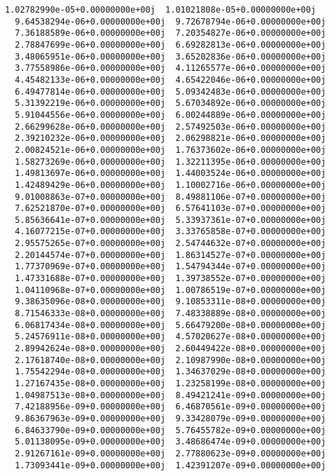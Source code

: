 \documentclass[11pt]{article}
\begin{document}
\begin{Verbatim}[commandchars=\\\{\}]
  1.02782990e-05+0.00000000e+00j  1.01021808e-05+0.00000000e+00j
  9.64538294e-06+0.00000000e+00j  9.72678794e-06+0.00000000e+00j
  7.36188589e-06+0.00000000e+00j  7.20354827e-06+0.00000000e+00j
  2.78847699e-06+0.00000000e+00j  6.69282813e-06+0.00000000e+00j
  3.48065951e-06+0.00000000e+00j  3.65202836e-06+0.00000000e+00j
  3.77558986e-06+0.00000000e+00j  4.11265577e-06+0.00000000e+00j
  4.45482133e-06+0.00000000e+00j  4.65422046e-06+0.00000000e+00j
  6.49477814e-06+0.00000000e+00j  5.09342483e-06+0.00000000e+00j
  5.31392219e-06+0.00000000e+00j  5.67034892e-06+0.00000000e+00j
  5.91044556e-06+0.00000000e+00j  6.00244889e-06+0.00000000e+00j
  2.66299628e-06+0.00000000e+00j  2.57492503e-06+0.00000000e+00j
  2.39210232e-06+0.00000000e+00j  2.06298821e-06+0.00000000e+00j
  2.00824521e-06+0.00000000e+00j  1.76373602e-06+0.00000000e+00j
  1.58273269e-06+0.00000000e+00j  1.32211395e-06+0.00000000e+00j
  1.49813697e-06+0.00000000e+00j  1.44003524e-06+0.00000000e+00j
  1.42489429e-06+0.00000000e+00j  1.10002716e-06+0.00000000e+00j
  9.01008863e-07+0.00000000e+00j  8.49881106e-07+0.00000000e+00j
  7.62521870e-07+0.00000000e+00j  6.57641103e-07+0.00000000e+00j
  5.85636641e-07+0.00000000e+00j  5.33937361e-07+0.00000000e+00j
  4.16077215e-07+0.00000000e+00j  3.33765858e-07+0.00000000e+00j
  2.95575265e-07+0.00000000e+00j  2.54744632e-07+0.00000000e+00j
  2.20144574e-07+0.00000000e+00j  1.86314527e-07+0.00000000e+00j
  1.77370969e-07+0.00000000e+00j  1.54794344e-07+0.00000000e+00j
  1.47331688e-07+0.00000000e+00j  1.39738552e-07+0.00000000e+00j
  1.04110968e-07+0.00000000e+00j  1.00786519e-07+0.00000000e+00j
  9.38635096e-08+0.00000000e+00j  9.10853311e-08+0.00000000e+00j
  8.71546333e-08+0.00000000e+00j  7.48338889e-08+0.00000000e+00j
  6.06817434e-08+0.00000000e+00j  5.66479200e-08+0.00000000e+00j
  5.24576911e-08+0.00000000e+00j  4.57020627e-08+0.00000000e+00j
  2.89942624e-08+0.00000000e+00j  2.60449422e-08+0.00000000e+00j
  2.17618740e-08+0.00000000e+00j  2.10987990e-08+0.00000000e+00j
  1.75542294e-08+0.00000000e+00j  1.34637029e-08+0.00000000e+00j
  1.27167435e-08+0.00000000e+00j  1.23258199e-08+0.00000000e+00j
  1.04987513e-08+0.00000000e+00j  8.49421241e-09+0.00000000e+00j
  7.42188956e-09+0.00000000e+00j  6.46870561e-09+0.00000000e+00j
  9.86367963e-09+0.00000000e+00j  9.33428079e-09+0.00000000e+00j
  6.84633790e-09+0.00000000e+00j  5.76455782e-09+0.00000000e+00j
  5.01138095e-09+0.00000000e+00j  3.48686474e-09+0.00000000e+00j
  2.91267161e-09+0.00000000e+00j  2.77880623e-09+0.00000000e+00j
  1.73093441e-09+0.00000000e+00j  1.42391207e-09+0.00000000e+00j

\end{Verbatim}
\end{document}
